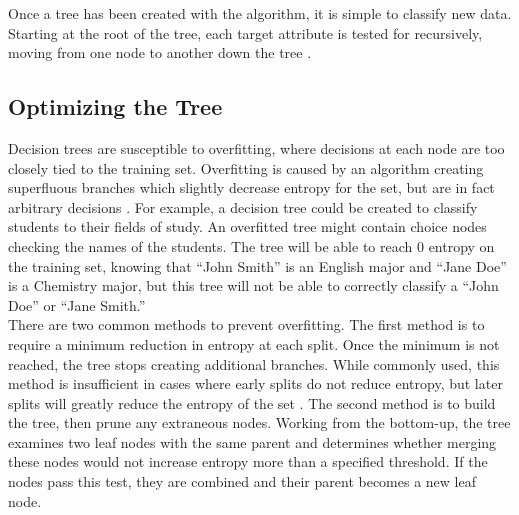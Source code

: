 Once a tree has been created with the algorithm, it is simple to classify new data. Starting at the root of the tree, each target attribute is tested for recursively, moving from one node to another down the tree \cite{sega07}.\\

\subsection{Optimizing the Tree}
Decision trees are susceptible to overfitting, where decisions at each node are too closely tied to the training set. Overfitting is caused by an algorithm creating superfluous branches which slightly decrease entropy for the set, but are in fact arbitrary decisions \cite{sega07}. For example, a decision tree could be created to classify students to their fields of study. An overfitted tree might contain choice nodes checking the names of the students. The tree will be able to reach 0 entropy on the training set, knowing that ``John Smith'' is an English major and ``Jane Doe'' is a Chemistry major, but this tree will not be able to correctly classify a ``John Doe'' or ``Jane Smith.''\\

There are two common methods to prevent overfitting. The first method is to require a minimum reduction in entropy at each split. Once the minimum is not reached, the tree stops creating additional branches. While commonly used, this method is insufficient in cases where early splits do not reduce entropy, but later splits will greatly reduce the entropy of the set \cite{sega07}. The second method is to build the tree, then prune any extraneous nodes. Working from the bottom-up, the tree examines two leaf nodes with the same parent and determines whether merging these nodes would not increase entropy more than a specified threshold. If the nodes pass this test, they are combined and their parent becomes a new leaf node.\\

